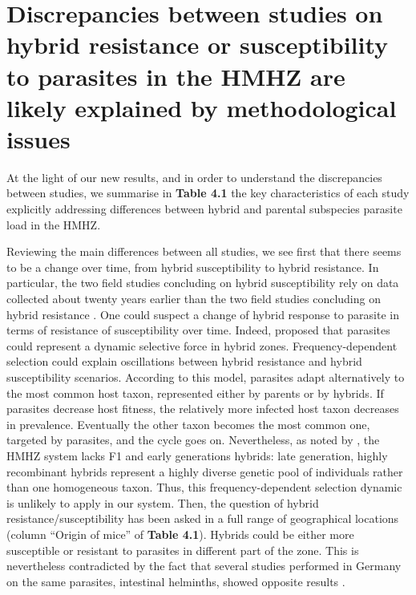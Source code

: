 \section{Discrepancies between studies on hybrid resistance or susceptibility to parasites in the HMHZ are likely explained by methodological issues}
At the light of our new results, and in order to understand the discrepancies between studies, we summarise in \textbf{Table 4.1} the key characteristics of each study explicitly addressing differences between hybrid and parental subspecies parasite load in the HMHZ. \par
Reviewing the main differences between all studies, we see first that there seems to be a change over time, from hybrid susceptibility to hybrid resistance. In particular, the two field studies concluding on hybrid susceptibility \citep{sage_wormy_1986, moulia_wormy_1991} rely on data collected about twenty years earlier than the two field studies concluding on hybrid resistance \citep{baird_where_2012, Balard2020}. One could suspect a change of hybrid response to parasite in terms of resistance of susceptibility over time. Indeed, \cite{wolinska_parasites_2008} proposed that parasites could represent a dynamic selective force in hybrid zones. Frequency-dependent selection could explain oscillations between hybrid resistance and hybrid susceptibility scenarios. According to this model, parasites adapt alternatively to the most common host taxon, represented either by parents or by hybrids. If parasites decrease host fitness, the relatively more infected host taxon decreases in prevalence. Eventually the other taxon becomes the most common one, targeted by parasites, and the cycle goes on. Nevertheless, as noted by \cite{baird_where_2012}, the HMHZ system lacks F1 and early generations hybrids: late generation, highly recombinant hybrids represent a highly diverse genetic pool of individuals rather than one homogeneous taxon. Thus, this frequency-dependent selection dynamic is unlikely to apply in our system. Then, the question of hybrid resistance/susceptibility has been asked in a full range of geographical locations (column “Origin of mice” of \textbf{Table 4.1}). Hybrids could be either more susceptible or resistant to parasites in different part of the zone. This is nevertheless contradicted by the fact that several studies performed in Germany on the same parasites, intestinal helminths, showed opposite results \parencites[hybrid susceptibility for][hybrid resistance for]{sage_wormy_1986}{baird_where_2012, Balard2020}. 

